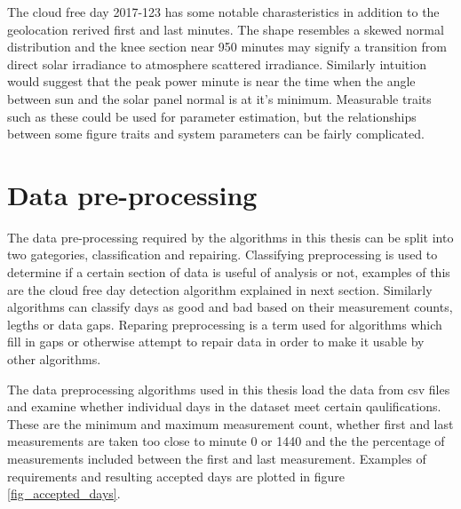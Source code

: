 The cloud free day 2017-123 has some notable charasteristics in addition to the geolocation rerived first and last minutes. The shape resembles a skewed normal distribution and the knee section near 950 minutes may signify a transition from direct solar irradiance to atmosphere scattered irradiance. Similarly intuition would suggest that the peak power minute is near the time when the angle between sun and the solar panel normal is at it's minimum. Measurable traits such as these could be used for parameter estimation, but the relationships between some figure traits and system parameters can be fairly complicated.



\newpage
\section{Data pre-processing}
The data pre-processing required by the algorithms in this thesis can be split into two gategories, classification and repairing. Classifying preprocessing is used to determine if a certain section of data is useful of analysis or not, examples of this are the cloud free day detection algorithm explained in next section. Similarly algorithms can classify days as good and bad based on their measurement counts, legths or data gaps. Reparing preprocessing is a term used for algorithms which fill in gaps or otherwise attempt to repair data in order to make it usable by other algorithms.

The data preprocessing algorithms used in this thesis load the data from csv files and examine whether individual days in the dataset meet certain qaulifications. These are the minimum and maximum measurement count, whether first and last measurements are taken too close to minute 0 or 1440 and the the percentage of measurements included between the first and last measurement. Examples of requirements and resulting accepted days are plotted in figure \ref{fig_accepted_days}. %

